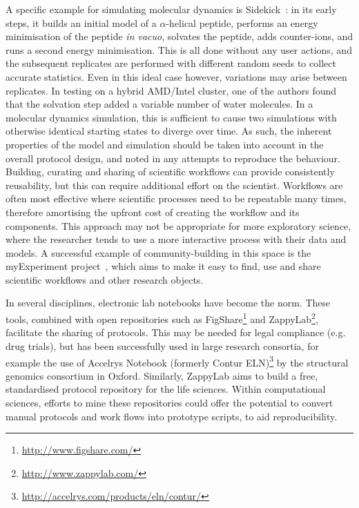 \documentclass[conference]{IEEEtran}
\begin{document}
A specific example for simulating molecular dynamics is
Sidekick~\cite{Hall2014Sidekick}: in its early steps, it builds an
initial model of a $\alpha$-helical peptide, performs an energy
minimisation of the peptide \emph{in vacuo}, solvates the peptide,
adds counter-ions, and runs a second energy minimisation. This is all
done without any user actions, and the subsequent replicates are
performed with different random seeds to collect accurate
statistics. Even in this ideal case however, variations may arise
between replicates. In testing on a hybrid AMD/Intel cluster, one of
the authors found that the solvation step added a variable number of
water molecules. In a molecular dynamics simulation, this is
sufficient to cause two simulations with otherwise identical starting
states to diverge over time. As such, the inherent properties of the
model and simulation should be taken into account in the overall
protocol design, and noted in any attempts to reproduce the
behaviour. Building, curating and sharing of scientific workflows can
provide consistently reusability, but this can require additional
effort on the scientist.  Workflows are often most effective where
scientific processes need to be repeatable many times, therefore
amortising the upfront cost of creating the workflow and its
components. This approach may not be appropriate for more exploratory
science, where the researcher tends to use a more interactive process
with their data and models. A successful example of community-building
in this space is the myExperiment project~\cite{myexperiment:2009},
which aims to make it easy to find, use and share scientific workflows
and other research objects.

In several disciplines, electronic lab notebooks have become the
norm. These tools, combined with open repositories such as
FigShare\footnote{\url{http://www.figshare.com/}} and
ZappyLab\footnote{\url{http://www.zappylab.com/}}, facilitate the
sharing of protocols. This may be needed for legal compliance
(e.g. drug trials), but has been successfully used in large research
consortia, for example the use of Accelrys Notebook (formerly Contur
ELN)\footnote{\url{http://accelrys.com/products/eln/contur/}} by the
structural genomics consortium in Oxford. Similarly, ZappyLab aims to
build a free, standardised protocol repository for the life
sciences. Within computational sciences, efforts to mine these
repositories could offer the potential to convert manual protocols and
work flows into prototype scripts, to aid reproducibility.
\end{document}
